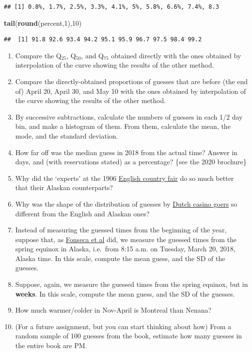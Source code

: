 \documentclass[]{book}
\newenvironment{Shaded}{\begin{snugshade}}{\end{snugshade}}
\newcommand{\DecValTok}[1]{\textcolor[rgb]{0.00,0.00,0.81}{#1}}
\newcommand{\KeywordTok}[1]{\textcolor[rgb]{0.13,0.29,0.53}{\textbf{#1}}}
\newcommand{\NormalTok}[1]{#1}
\begin{document}
\begin{verbatim}
## [1] 0.8%, 1.7%, 2.5%, 3.3%, 4.1%, 5%, 5.8%, 6.6%, 7.4%, 8.3
\end{verbatim}

\begin{Shaded}
\begin{Highlighting}[]
\KeywordTok{tail}\NormalTok{(}\KeywordTok{round}\NormalTok{(percent,}\DecValTok{1}\NormalTok{),}\DecValTok{10}\NormalTok{)}
\end{Highlighting}
\end{Shaded}

\begin{verbatim}
##  [1] 91.8 92.6 93.4 94.2 95.1 95.9 96.7 97.5 98.4 99.2
\end{verbatim}

\begin{enumerate}
\def\labelenumi{\arabic{enumi}.}
\setcounter{enumi}{2}
\item
  Compare the Q\(_{25}\), Q\(_{50}\), and Q\(_{75}\) obtained directly with the ones obtained by interpolation of the curve showing the results of the other method.
\item
  Compare the directly-obtained proportions of guesses that are before (the end of) April 20, April 30, and May 10 with the ones obtained by interpolation of the curve showing the results of the other method.
\item
  By successive subtractions, calculate the numbers of guesses in each 1/2 day bin, and make a histogram of them. From them, calculate the mean, the mode, and the standard deviation.
\item
  How far off was the median guess in 2018 from the actual time? Answer in days, and (with reservations stated) as a percentage? \{see the 2020 brochure\}
\item
  Why did the `experts' at the 1906 \href{http://galton.org/essays/1900-1911/galton-1907-vox-populi.pdf}{English country fair} do so much better that their Alaskan counterparts?
\item
  Why was the shape of the distribution of guesses by \href{http://www.medicine.mcgill.ca/epidemiology/hanley/bios691/The_wisdom_of_the_inner_crowd_.pdf}{Dutch casino goers} so different from the English and Alaskan ones?
\item
  Instead of measuring the guessed times from the beginning of the year, suppose that, as \href{http://www.medicine.mcgill.ca/epidemiology/hanley/bios691/VoxPopuliNenana.pdf}{Fonseca et al}
  did, we measure the guessed times from the spring equinox in Alaska, i.e.~from 8:15 a.m. on Tuesday, March 20, 2018, Alaska time. In this scale, compute the mean guess, and the SD of the guesses.
\item
  Suppose, again, we measure the guessed times from the spring equinox, but in \textbf{weeks}. In this scale, compute the mean guess, and the SD of the guesses.
\item
  How much warmer/colder in Nov-April is Montreal than Nenana?
\item
  (For a future assignment, but you can start thinking about how) From a random sample of 100 guesses from the book, estimate how many guesses in the entire book are PM.
\end{enumerate}
\end{document}
